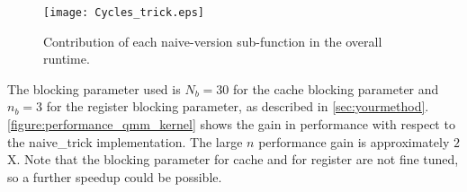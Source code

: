 \begin{figure}[h]
\texttt{[image: Cycles\_trick.eps]}
\caption{Contribution of each naive-version sub-function in the overall runtime.} 
\label{figure:Cycles_trick}
\end{figure}


The blocking parameter used is $N_b = 30$ for the cache blocking parameter and $n_b = 3$ for the register blocking parameter, as described in \cref{sec:yourmethod}. \cref{figure:performance_qmm_kernel} shows the gain in performance with respect to the naive\_trick implementation. The large $n$ performance gain is approximately $2$X. Note that the blocking parameter for cache and for register are not fine tuned, so a further speedup could be possible.

\begin{comment}
Next divide the experiments into classes, one paragraph for each. In the simplest case you have one plot that has the size on the x-axis and the performance on the y-axis. The plot will contain several lines, one for each relevant code version. Discuss the plot and extract the overall performance gain from baseline to best code. Also state the percentage of peak performance for the best code. Note that the peak may change depending on the situation. For example, if you only do additions it would be 12 Gflop/s
on one core with 3 Ghz and SSE and single precision floating point.

Do not put two performance lines into the same plot if the operations count changed significantly (that's apples and oranges). In that case first perform the optimizations that reduce op count and report the runtime gain in a plot. Then continue to optimize the best version and show performance plots.

{\bf You should}
\begin{itemize}
\item Follow the guide to benchmarking presented in class, in particular
\item very readable, attractive plots (do 1 column, not 2 column plots
for this class), proper readable font size. An example is below (of course you can have a different style),
\item every plot answers a question, which you pose and extract the
answer from the plot in its discussion
\end{itemize}
Every plot should be discussed (what does it show, which statements do
you extract).
\end{comment}

